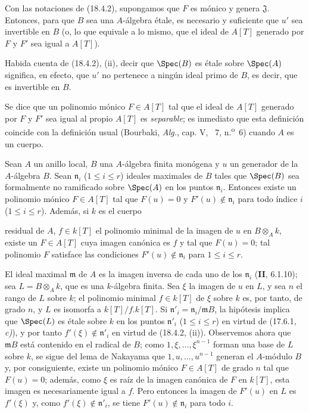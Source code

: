 \begin{corollary}[18.4.3]
\label{IV.18.4.3}
Con las notaciones de \textup{(18.4.2)}, supongamos que $F$ es mónico y genera $\mathfrak J$. Entonces, para que $B$ sea una $A$-álgebra étale, es necesario y suficiente que $u'$ sea invertible en $B$ \textup{(o, lo que equivale a lo mismo, que el ideal de $A[T]$ generado por $F$ y $F'$ sea igual a $A[T]$)}.
\end{corollary}

Habida cuenta de (18.4.2), (ii), decir que $\Spec(B)$ es étale sobre $\Spec(A)$ significa, en efecto, que $u'$ no pertenece a ningún ideal primo de $B$, es decir, que es invertible en $B$.

Se dice que un polinomio mónico $F\in A[T]$ tal que el ideal de $A[T]$ generado por $F$ y $F'$ sea igual al propio $A[T]$ es \emph{separable}; es inmediato que esta definición coincide con la definición usual (Bourbaki, \emph{Alg.}, cap. V, \textsection~7, n.\textsuperscript{o}~6) cuando $A$ es un cuerpo.

\begin{lemma}[18.4.4]
\label{IV.18.4.4}
Sean $A$ un anillo local, $B$ una $A$-álgebra finita monógena y $u$ un generador de la $A$-álgebra $B$. Sean $\mathfrak n_i$ \textup{(}$1\leq i\leq r$\textup{)} ideales maximales de $B$ tales que $\Spec(B)$ sea formalmente no ramificado sobre $\Spec(A)$ en los puntos $\mathfrak n_i$. Entonces existe un polinomio mónico $F\in A[T]$ tal que $F(u)=0$ y $F'(u)\notin\mathfrak n_i$ para todo índice $i$ \textup{(}$1\leq i\leq r$\textup{)}. Además, si $k$ es el cuerpo


residual de $A$, $f\in k[T]$ el polinomio minimal de la imagen de $u$ en $B\otimes_A k$, existe un $F\in A[T]$ cuya imagen canónica es $f$ y tal que $F(u)=0$; tal polinomio $F$ satisface las condiciones $F'(u)\notin\mathfrak n_i$ para $1\leq i\leq r$.
\end{lemma}

El ideal maximal $\mathfrak m$ de $A$ es la imagen inversa de cada uno de los $\mathfrak n_i$ (\textbf{II}, 6.1.10); sea $L=B\otimes_A k$, que es una $k$-álgebra finita. Sea $\xi$ la imagen de $u$ en $L$, y sea $n$ el rango de $L$ sobre $k$; el polinomio minimal $f\in k[T]$ de $\xi$ sobre $k$ es, por tanto, de grado $n$, y $L$ es isomorfa a $k[T]/f.k[T]$. Si $\mathfrak n'_i=\mathfrak n_i/\mathfrak mB$, la hipótesis implica que $\Spec(L)$ es étale sobre $k$ en los puntos $\mathfrak n'_i$ ($1\leq i\leq r$) en virtud de (17.6.1, \emph{c)}), y por tanto $f'(\xi)\notin\mathfrak n'_i$ en virtud de (18.4.2, (ii)). Observemos ahora que $\mathfrak mB$ está contenido en el radical de $B$; como $1,\xi,\ldots,\xi^{n-1}$ forman una base de $L$ sobre $k$, se sigue del lema de Nakayama que $1,u,\ldots,u^{n-1}$ generan el $A$-módulo $B$ y, por consiguiente, existe un polinomio mónico $F\in A[T]$ de grado $n$ tal que $F(u)=0$; además, como $\xi$ es raíz de la imagen canónica de $F$ en $k[T]$, esta imagen es necesariamente igual a $f$. Pero entonces la imagen de $F'(u)$ en $L$ es $f'(\xi)$ y, como $f'(\xi)\notin\mathfrak n'_i$, se tiene $F'(u)\notin\mathfrak n_i$ para todo $i$.

